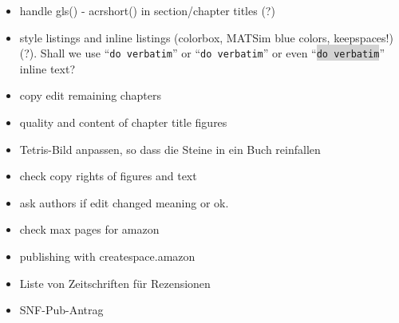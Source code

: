 \begin{itemize}
\item handle gls() - acrshort() in section/chapter titles (?)

\item style listings and inline listings (colorbox, MATSim blue colors, keepspaces!) (?). Shall we use ``\verb|do verbatim|'' or ``\lstinline|do verbatim|'' or even ``\colorbox{lightgray}{\lstinline|do verbatim|}'' inline text?

\item copy edit remaining chapters

\item quality and content of chapter title figures

\item Tetris-Bild anpassen, so dass die Steine in ein Buch reinfallen

\item check copy rights of figures and text

\item ask authors if edit changed meaning or ok.

\item check max pages for amazon

\item publishing with createspace.amazon

\item Liste von Zeitschriften für Rezensionen

\item SNF-Pub-Antrag






\end{itemize}



